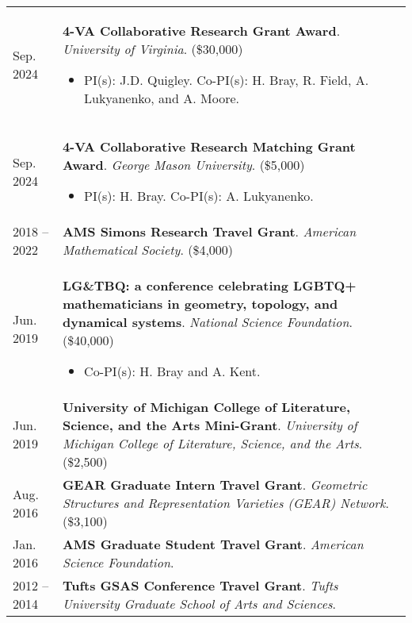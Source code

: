 
    \medskip


    \medskip
    
    \begin{center}
    {
    \renewcommand{\arraystretch}{1.5}
    \begin{longtable}{p{}  p{}}
     Sep.  2024 & \textbf{4-VA Collaborative Research Grant Award}. \textit{University of Virginia}. (\$30,000)
        \hspace{-1em}

        {\small
        \begin{itemize}
        \setlength{\parindent}{0em}
        \item[] PI(s): J.D. Quigley. Co-PI(s): H. Bray, R. Field, A. Lukyanenko, and A. Moore.
        \end{itemize}
        }
        \vspace{-1em}
         \\ 
 Sep.  2024 & \textbf{4-VA Collaborative Research Matching Grant Award}. \textit{George Mason University}. (\$5,000)
        \hspace{-1em}

        {\small
        \begin{itemize}
        \setlength{\parindent}{0em}
        \item[] PI(s): H. Bray. Co-PI(s): A. Lukyanenko.
        \end{itemize}
        }
        \vspace{-1em}
         \\ 
   2018 --    2022 & \textbf{AMS Simons Research Travel Grant}. \textit{American Mathematical Society}. (\$4,000) \\ 
 Jun.  2019 & \textbf{LG\&TBQ: a conference celebrating LGBTQ+ mathematicians in geometry, topology, and dynamical systems}. \textit{National Science Foundation}. (\$40,000)
        \hspace{-1em}

        {\small
        \begin{itemize}
        \setlength{\parindent}{0em}
        \item[] Co-PI(s): H. Bray and A. Kent.
        \end{itemize}
        }
        \vspace{-1em}
         \\ 
 Jun.  2019 & \textbf{University of Michigan College of Literature, Science, and the Arts Mini-Grant}. \textit{University of Michigan College of Literature, Science, and the Arts}. (\$2,500) \\ 
 Aug.  2016 & \textbf{GEAR Graduate Intern Travel Grant}. \textit{Geometric Structures and Representation Varieties (GEAR) Network}. (\$3,100) \\ 
 Jan.  2016 & \textbf{AMS Graduate Student Travel Grant}. \textit{American Science Foundation}.  \\ 
   2012 --    2014 & \textbf{Tufts GSAS Conference Travel Grant}. \textit{Tufts University Graduate School of Arts and Sciences}.  
    \end{longtable}
    } 
    \end{center}

